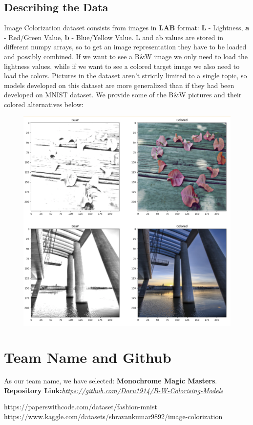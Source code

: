 \documentclass[]{article}
\begin{document}
	\subsection{Describing the Data}
	
	Image Colorization dataset consists from images in \textbf{LAB} format: \textbf{L} - Lightness, \textbf{a} - Red/Green Value, \textbf{b} - Blue/Yellow Value. L and ab values are stored in different numpy arrays, so to get an image representation they have to be loaded and possibly combined. If we want to see a B\&W image we only need to load the lightness values, while if we want to see a colored target image we also need to load the colors. Pictures in the dataset aren't strictly limited to a single topic, so models developed on this dataset are more generalized than if they had been developed on MNIST dataset. We provide some of the B\&W pictures and their colored alternatives below:
	\begin{figure}[H]
		\includegraphics{image1.png}
	\end{figure}
	
	\section{Team Name and Github}
	
	As our team name, we have selected: \textbf{Monochrome Magic Masters}.\\
	
	\textbf{Repository Link:}\href{https://github.com/Daru1914/B-W-Colorising-Models}{\emph{https://github.com/Daru1914/B-W-Colorising-Models}}
	
	\begin{thebibliography}{9}
		 https://paperswithcode.com/dataset/fashion-mnist
		https://www.kaggle.com/datasets/shravankumar9892/image-colorization
	\end{thebibliography}
	
\end{document}
